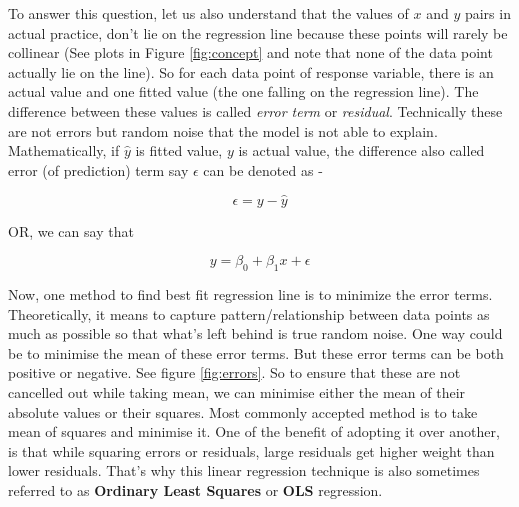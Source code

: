 \documentclass[
]{book}
\begin{document}
To answer this question, let us also understand that the values of \(x\) and \(y\) pairs in actual practice, don't lie on the regression line because these points will rarely be collinear (See plots in Figure \ref{fig:concept} and note that none of the data point actually lie on the line). So for each data point of response variable, there is an actual value and one fitted value (the one falling on the regression line). The difference between these values is called \emph{error term} or \emph{residual}. Technically these are not errors but random noise that the model is not able to explain. Mathematically, if \(\hat{y}\) is fitted value, \(y\) is actual value, the difference also called error (of prediction) term say \(\epsilon\) can be denoted as -

\begin{equation} 
\epsilon = y - \hat{y}
\label{eq:lr2}
\end{equation}

OR, we can say that

\begin{equation} 
y = \beta_0 + \beta_1x + \epsilon
\label{eq:lr3}
\end{equation}

Now, one method to find best fit regression line is to minimize the error terms. Theoretically, it means to capture pattern/relationship between data points as much as possible so that what's left behind is true random noise. One way could be to minimise the mean of these error terms. But these error terms can be both positive or negative. See figure \ref{fig:errors}. So to ensure that these are not cancelled out while taking mean, we can minimise either the mean of their absolute values or their squares. Most commonly accepted method is to take mean of squares and minimise it. One of the benefit of adopting it over another, is that while squaring errors or residuals, large residuals get higher weight than lower residuals. That's why this linear regression technique is also sometimes referred to as \textbf{Ordinary Least Squares} or \textbf{OLS} regression.
\end{document}
